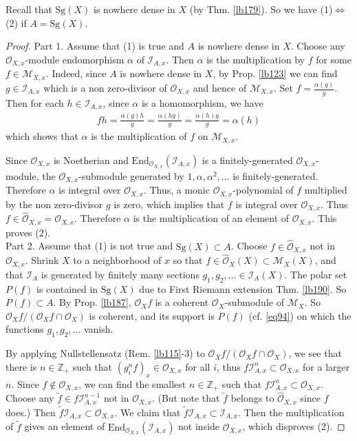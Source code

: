 \documentclass[12pt,b5paper,notitlepage]{report}
\theoremstyle{definition}
\theoremstyle{plain}
\newcommand{\wtd}{\widetilde}
\newcommand{\End}{\mathrm{End}} %
\newcommand{\scr}{\mathscr}
\newcommand{\Zbb}{\mathbb Z}
\newcommand{\Sg}{\mathrm{Sg}}
\newcommand{\Owht}{\widehat{\scr O}}
\numberwithin{equation}{section}
\begin{document}
Recall that $\Sg(X)$ is nowhere dense in $X$ (by Thm. \ref{lb179}). So we have (1)$\Leftrightarrow$(2) if $A=\Sg(X)$.


\begin{proof}
Part 1. Assume that (1) is true and $A$ is nowhere dense in $X$. Choose any $\scr O_{X,x}$-module endomorphism $\alpha$ of $\scr I_{A,x}$. Then $\alpha$ is the multiplication by $f$ for some $f\in\scr M_{X,x}$. Indeed, since $A$ is nowhere dense in $X$, by Prop. \ref{lb123} we can find $g\in\scr I_{A,x}$ which is a non zero-divisor of $\scr O_{X,x}$ and hence of $\scr M_{X,x}$. Set $f=\frac{\alpha(g)}{g}$. Then for each $h\in\scr I_{A,x}$, since $\alpha$ is a homomorphism, we have
\begin{align*}
fh=\frac{\alpha(g)h}{g}=\frac{\alpha(hg)}{g}=\frac{\alpha(h)g}{g}=\alpha(h)
\end{align*}
which shows that $\alpha$ is the multiplication of $f$ on $\scr M_{X,x}$.

Since $\scr O_{X,x}$ is Noetherian and $\End_{\scr O_{X,x}}(\scr I_{A,x})$ is a finitely-generated $\scr O_{X,x}$-module, the $\scr O_{X,x}$-submodule generated by $1,\alpha,\alpha^2,\dots$ is finitely-generated. Therefore $\alpha$ is integral over $\scr O_{X,x}$. Thus, a monic $\scr O_{X,x}$-polynomial of $f$ multiplied by the non zero-divisor $g$ is zero, which implies that $f$ is integral over  $\scr O_{X,x}$. Thus $f\in\Owht_{X,x}=\scr O_{X,x}$. Therefore $\alpha$ is the multiplication of an element of $\scr O_{X,x}$. This proves (2).\\


Part 2. Assume that (1) is not true and $\Sg(X)\subset A$. Choose $f\in\Owht_{X,x}$ not in $\scr O_{X,x}$. Shrink $X$ to a neighborhood of $x$ so that $f\in\Owht_X(X)\subset\scr M_X(X)$, and that $\scr I_{A}$ is generated by finitely many sections $g_1,g_2,\dots\in\scr I_{A}(X)$. The polar set $P(f)$ is contained in $\Sg(X)$ due to First Riemann extension Thm. \ref{lb190}. So $P(f)\subset A$. By Prop. \ref{lb187}, $\scr O_Xf$ is a coherent $\scr O_X$-submodule of $\scr M_X$. So $\scr O_Xf/(\scr O_Xf\cap\scr O_X)$ is coherent, and its support is $P(f)$ (cf. \eqref{eq94}) on which the functions $g_1,g_2,\dots$ vanish.

By applying Nullstellensatz (Rem. \ref{lb115}-3) to $\scr O_Xf/(\scr O_Xf\cap\scr O_X)$, we see that there is $n\in\Zbb_+$ such that $(g_i^nf)_x\in\scr O_{X,x}$ for all $i$, thus $f\scr I_{A,x}^n\subset\scr O_{X,x}$ for a larger $n$. Since $f\notin\scr O_{X,x}$, we can find the smallest $n\in\Zbb_+$ such that $f\scr I_{A,x}^n\subset\scr O_{X,x}$. Choose any $\wtd f\in f\scr I_{A,x}^{n-1}$ not in $\scr O_{X,x}$. (But note that $\wtd f$ belongs to $\Owht_{X,x}$ since $f$ does.) Then $\wtd f\scr I_{A,x}\subset\scr O_{X,x}$. We claim that $\wtd f\scr I_{A,x}\subset\scr I_{A,x}$. Then the multiplication of $\wtd f$ gives an element of $\End_{\scr O_{X,x}}(\scr I_{A,x})$ not inside $\scr O_{X,x}$, which disproves (2).


\end{proof}
\end{document}
